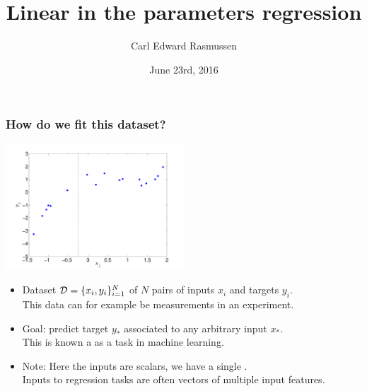 

\title{Linear in the parameters regression}
\author{Carl Edward Rasmussen}
\date{June 23rd, 2016}



\begin{frame}
\titlepage
\end{frame}

\begin{frame}
\frametitle{How do we fit this dataset?}

\centerline{\includegraphics[width=0.5\textwidth]{toy_data.pdf}}

\vfill

\begin{itemize}
\item Dataset ${\cal D}=\{x_i,y_i\}_{i=1}^N$ of $N$ pairs of inputs 
$x_i$ and  targets $y_i$.\\ This data can for example be
measurements in an experiment.
\item Goal: predict target $y_*$ associated to any arbitrary input 
$x_*$.\\ This is known a as a  task in machine learning.
\item Note: Here the inputs are scalars, we have a single .\\ 
Inputs to regression tasks are often vectors of multiple input features.
\end{itemize}
\end{frame}


